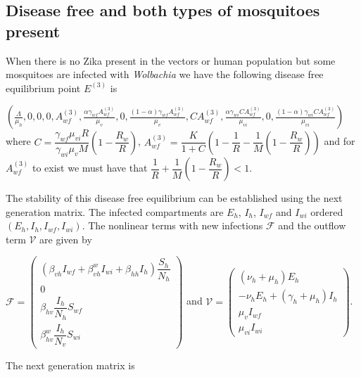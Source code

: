 \documentclass{ws-rv9x6}
\begin{document}
\subsection{Disease free and both types of mosquitoes present}
When there is no Zika present in the vectors or human population but some  mosquitoes are infected with \textit{Wolbachia} we have the following disease free equilibrium point $E^{(3)}$ is

\noindent $\left(\frac{\Lambda}{\mu_h},0,0,0,A^{(3)}_{wf},\frac{\alpha \gamma_{wf}A^{(3)}_{wf}}{\mu_v},0,\frac{(1-\alpha)\gamma_{wf}A^{(3)}_{wf}}{\mu_v},CA^{(3)}_{wf},\frac{\alpha\gamma_{wi}CA^{(3)}_{wf}}{\mu_{vi}},0,\frac{(1-\alpha)\gamma_{wi}CA^{(3)}_{wf}}{\mu_{vi}}\right)$ where $C=\dfrac{\gamma_{wf}\mu_{vi}R}{\gamma_{wi}\mu_vM}\left(1-\dfrac{R_w}{R}\right)$, $A^{(3)}_{wf}=\dfrac{K}{1+C}\left( 1-\dfrac{1}{R}-\dfrac{1}{M}\left(1-\dfrac{R_w}{R}\right)\right)$ and for $A^{(3)}_{wf}$ to exist we must have that $\dfrac{1}{R}+\dfrac{1}{M}\left(1-\dfrac{R_w}{R}\right)<1$. 

The stability of this disease free equilibrium can be established using the next generation matrix. The infected compartments are $E_h$, $I_h$, $I_{wf}$ and $I_{wi}$ ordered $(E_h, I_h, I_{wf}, I_{wi})$. The nonlinear terms with new infections $\mathcal{F}$ and the outflow term $\mathcal{V}$ are given by

\vspace{0.2in}
$\mathcal{F}=\left(\begin{array}{c}
     (\beta_{vh}I_{wf}+\beta^w_{vh}I_{wi}+\beta_{hh}I_h)\dfrac{S_h}{N_h}  \\
     0\\
     \beta_{hv}\dfrac{I_h}{N_h}S_{wf}\\
     \beta^w_{hv}\dfrac{I_h}{N_v}S_{wi}
\end{array}\right)$
 and $\mathcal{V}=\left(\begin{array}{c}
      (\nu_h+\mu_h)E_h \\
      -\nu_hE_h+(\gamma_h+\mu_h)I_h\\
      \mu_vI_{wf}\\
      \mu_{vi}I_{wi}      
 \end{array}\right)$.
 
 \vspace{0.2in}

 \noindent The next generation matrix is 
 
\end{document}
